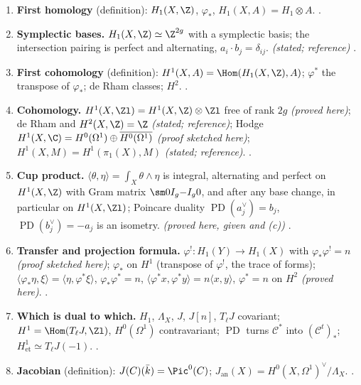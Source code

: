 \begin{enumerate}[label=\textbf{\thechapter.\arabic*}]
{here)}; Riemann's relations; the periods form a lattice $\Lambda_X$ \emph{(proved here, given the sketched identity)}. .
\item \textbf{First homology} (definition): $H_1(X,\Z)$, $\varphi_*$, $H_1(X,A)=H_1\otimes A$. .
\item \textbf{Symplectic bases.} $H_1(X,\Z)\simeq\Z^{2g}$ with a symplectic basis; the intersection pairing is perfect and alternating, $a_i\cdot b_j=\delta_{ij}$. \emph{(stated; reference)}
.
\item \textbf{First cohomology} (definition): $H^1(X,A)=\Hom(H_1(X,\Z),A)$; $\varphi^*$ the transpose of $\varphi_*$; de Rham classes; $H^2$. .
\item \textbf{Cohomology.} $H^1(X,\Zl)=H^1(X,\Z)\otimes\Zl$ free of rank $2g$ \emph{(proved here)}; de Rham and $H^2(X,\Z)=\Z$ \emph{(stated; reference)}; Hodge
$H^1(X,\C)=H^0(\Omega^1)\oplus\overline{H^0(\Omega^1)}$ \emph{(proof sketched here)}; $H^1(X,M)=H^1(\pi_1(X),M)$ \emph{(stated; reference)}. .
\item \textbf{Cup product.} $\langle\theta,\eta\rangle=\int_X\theta\wedge\eta$ is integral, alternating and perfect on $H^1(X,\Z)$ with Gram matrix $\sm0{I_g}{-I_g}0$, and after any base change, in
particular on $H^1(X,\Zl)$; Poincare duality $\operatorname{PD}(a_j^\vee)=b_j$, $\operatorname{PD}(b_j^\vee)=-a_j$ is an isometry. \emph{(proved here, given  and
(c))} .
\item \textbf{Transfer and projection formula.} $\varphi^!\colon H_1(Y)\to H_1(X)$ with $\varphi_*\varphi^!=n$ \emph{(proof sketched here)}; $\varphi_*$ on $H^1$ (transpose of $\varphi^!$, the trace of
forms); $\langle\varphi_*\eta,\xi\rangle=\langle\eta,\varphi^*\xi\rangle$, $\varphi_*\varphi^*=n$, $\langle\varphi^*x,\varphi^*y\rangle=n\langle x,y\rangle$, $\varphi^*=n$ on $H^2$ \emph{(proved here)}. .
\item \textbf{Which is dual to which.} $H_1$, $\Lambda_X$, $J$, $J[n]$, $T_\ell J$ covariant; $H^1=\Hom(T_\ell J,\Zl)$, $H^0(\Omega^1)$ contravariant; $\operatorname{PD}$ turns $\mathcal C^*$ into $(\mathcal C^t)_*$;
$H^1_{\mathrm{et}}\simeq T_\ell J(-1)$. .
\item \textbf{Jacobian} (definition): $J(C)(\bar k)=\Pic^0(C)$; $J_{\mathrm{an}}(X)=H^0(X,\Omega^1)^\vee/\Lambda_X$. .

\end{enumerate}

